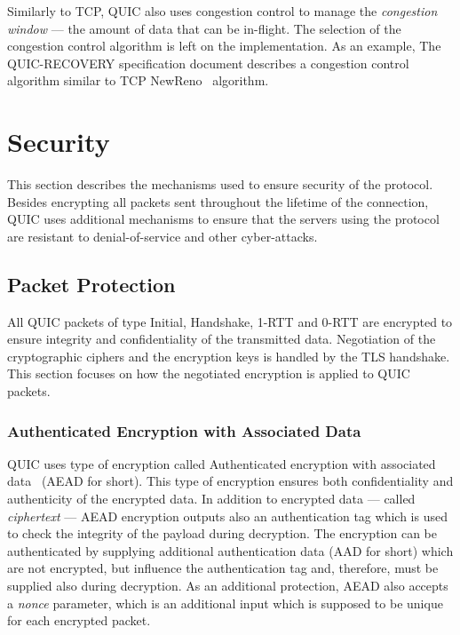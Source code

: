 Similarly to TCP, QUIC also uses congestion control to manage the \textit{congestion window} --- the
amount of data that can be in-flight. The selection of the congestion control algorithm is left on
the implementation. As an example, The QUIC-RECOVERY specification document describes a congestion
control algorithm similar to TCP NewReno~\cite{rfc6582} algorithm.

\section{Security}

This section describes the mechanisms used to ensure security of the protocol. Besides encrypting
all packets sent throughout the lifetime of the connection, QUIC uses additional mechanisms to
ensure that the servers using the protocol are resistant to denial-of-service and other
cyber-attacks.

\subsection{Packet Protection}\label{sec:packet-protection}

All QUIC packets of type Initial, Handshake, 1-RTT and 0-RTT are encrypted to ensure integrity and
confidentiality of the transmitted data. Negotiation of the cryptographic ciphers and the encryption
keys is handled by the TLS handshake. This section focuses on how the negotiated encryption is
applied to QUIC packets.

\subsubsection{Authenticated Encryption with Associated Data}

QUIC uses type of encryption called Authenticated encryption with associated data~\cite{rfc5116}
(AEAD for short). This type of encryption ensures both confidentiality and authenticity of the
encrypted data. In addition to encrypted data --- called \textit{ciphertext} --- AEAD encryption
outputs also an authentication tag which is used to check the integrity of the payload during
decryption. The encryption can be authenticated by supplying additional authentication data (AAD for
short) which are not encrypted, but influence the authentication tag and, therefore, must be
supplied also during decryption. As an additional protection, AEAD also accepts a \textit{nonce}
parameter, which is an additional input which is supposed to be unique for each encrypted packet.

